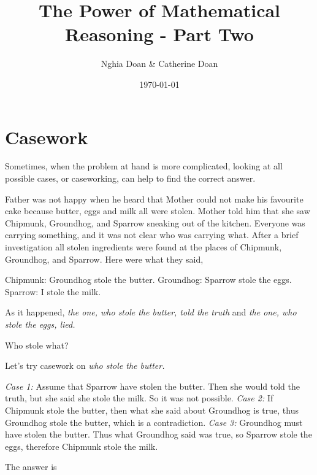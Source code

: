 \documentclass{article}
\title{The Power of Mathematical Reasoning - Part Two}
\author{Nghia Doan \& Catherine Doan}
\date{\today}
\begin{document}
\maketitle

\section*{Casework}

Sometimes, when the problem at hand is more complicated, 
looking at all possible cases, or caseworking, can help to find the correct answer.

\begin{example*}
    \label{example:pi-2022-4-p8}
    Father was not happy when he heard that Mother could not make his favourite cake because butter, eggs and milk all were stolen.
    Mother told him that she saw Chipmunk, Groundhog, and Sparrow sneaking out of the kitchen.
    Everyone was carrying something, and it was not clear who was carrying what.
    After a brief investigation all stolen ingredients were found at the places of Chipmunk, Groundhog, and Sparrow.
    Here were what they said,
    \begin{itemize}[topsep=0pt, partopsep=0pt, itemsep=0pt]
        \ii Chipmunk: Groundhog stole the butter.
        \ii Groundhog: Sparrow stole the eggs.
        \ii Sparrow: I stole the milk.
    \end{itemize}
    As it happened, \textit{the one, who stole the butter, told the truth} and \textit{the one, who stole the eggs, lied.}

    Who stole what?
\end{example*}

\begin{soln} 
    Let's try casework on \textit{who stole the butter.}
    \begin{itemize}[topsep=0pt, partopsep=0pt, itemsep=0pt]
        \ii \textit{Case 1:} Assume that Sparrow have stolen the butter. 
        Then she would told the truth, but she said she stole the milk. So it was not possible.
        \ii \textit{Case 2:} If Chipmunk stole the butter, then what she said about Groundhog is true,
        thus Groundhog stole the butter, which is a contradiction.
        \ii \textit{Case 3:} Groundhog must have stolen the butter. 
        Thus what Groundhog said was true, so Sparrow stole the eggs, therefore Chipmunk stole the milk.
    \end{itemize}    
    The answer is 
\end{soln}
\end{document}
